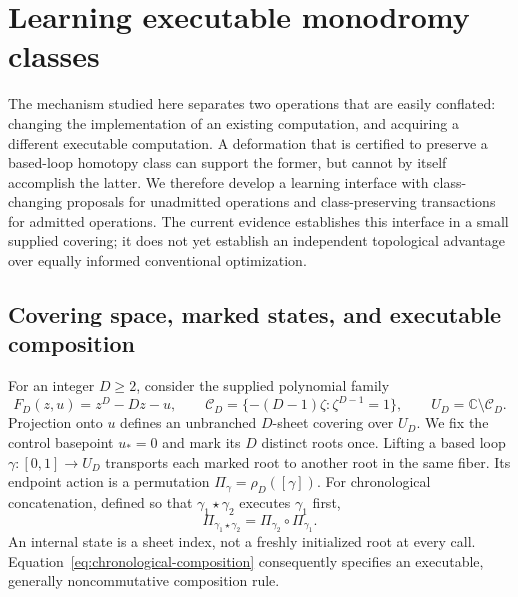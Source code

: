 \section{Learning executable monodromy classes}
\label{sec:monodromy-principle}

The mechanism studied here separates two operations that are easily conflated:
changing the implementation of an existing computation, and acquiring a
different executable computation. A deformation that is certified to preserve
a based-loop homotopy class can support the former, but cannot by itself
accomplish the latter. We therefore develop a learning interface with
class-changing proposals for unadmitted operations and class-preserving
transactions for admitted operations. The current evidence establishes this
interface in a small supplied covering; it does not yet establish an independent
topological advantage over equally informed conventional optimization.

\subsection{Covering space, marked states, and executable composition}

For an integer $D\geq 2$, consider the supplied polynomial family
\begin{equation}
 F_D(z,u)=z^D-Dz-u,
 \qquad
 \mathcal C_D=\{-(D-1)\zeta:\zeta^{D-1}=1\},
 \qquad U_D=\mathbb C\setminus\mathcal C_D.
 \label{eq:cover-and-critical-set}
\end{equation}
Projection onto $u$ defines an unbranched $D$-sheet covering over $U_D$.
We fix the control basepoint $u_*=0$ and mark its $D$ distinct roots once.
Lifting a based loop $\gamma:[0,1]\to U_D$ transports each marked root to
another root in the same fiber. Its endpoint action is a permutation
$\Pi_\gamma=\rho_D([\gamma])$. For chronological concatenation, defined so
that $\gamma_1\star\gamma_2$ executes $\gamma_1$ first,
\begin{equation}
 \Pi_{\gamma_1\star\gamma_2}
   =\Pi_{\gamma_2}\circ\Pi_{\gamma_1}.
 \label{eq:chronological-composition}
\end{equation}
An internal state is a sheet index, not a freshly initialized root at every
call. Equation~\eqref{eq:chronological-composition} consequently specifies an
executable, generally noncommutative composition rule.

